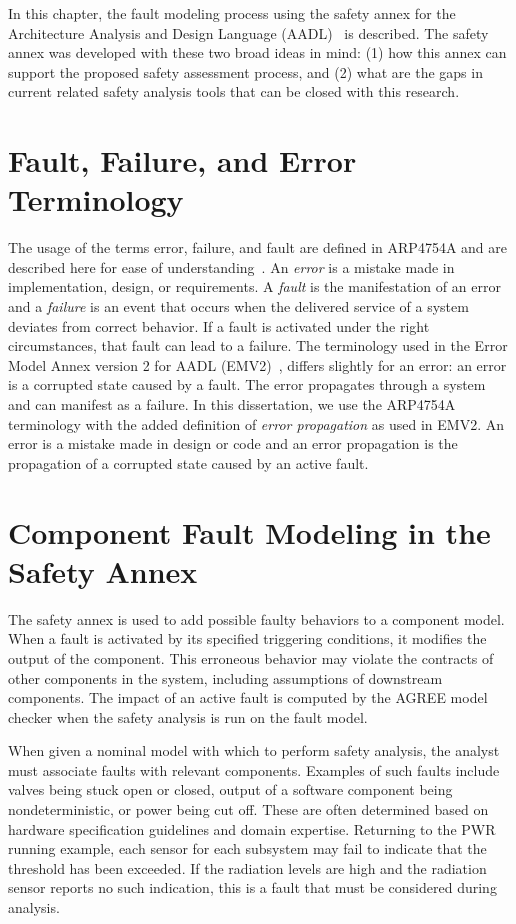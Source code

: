 In this chapter, the fault modeling process using the safety annex for the Architecture Analysis and Design Language (AADL)~\cite{AADL_Standard} is described. The safety annex was developed with these two broad ideas in mind: (1) how this annex can support the proposed safety assessment process, and (2) what are the gaps in current related safety analysis tools that can be closed with this research.

\section{Fault, Failure, and Error Terminology}
The usage of the terms error, failure, and fault are defined in ARP4754A and are described here for ease of understanding~\cite{SAE:ARP4754A}. An \textit{error} is a mistake made in implementation, design, or requirements. A \textit{fault} is the manifestation of an error and a \textit{failure} is an event that occurs when the delivered service of a system deviates from correct behavior. If a fault is activated under the right circumstances, that fault can lead to a failure. The terminology used in the Error Model Annex version 2 for AADL (EMV2)~\cite{EMV2}, differs slightly for an error: an error is a corrupted state caused by a fault. The error propagates through a system and can manifest as a failure. In this dissertation, we use the ARP4754A terminology with the added definition of \textit{error propagation} as used in EMV2. An error is a mistake made in design or code and an error propagation is the propagation of a corrupted state caused by an active fault. 




\section{Component Fault Modeling in the Safety Annex}
The safety annex is used to add possible faulty behaviors to a component model. When a fault is activated by its specified triggering conditions, it modifies the output of the component. This erroneous behavior may violate the contracts of other components in the system, including assumptions of downstream components. The impact of an active fault is computed by the AGREE model checker when the safety analysis is run on the fault model. 

When given a nominal model with which to perform safety analysis, the analyst must associate faults with relevant components. Examples of such faults include valves being stuck open or closed, output of a software component being nondeterministic, or power being cut off. These are often determined based on hardware specification guidelines and domain expertise. Returning to the PWR running example, each sensor for each subsystem may fail to indicate that the threshold has been exceeded. If the radiation levels are high and the radiation sensor reports no such indication, this is a fault that must be considered during analysis. 

